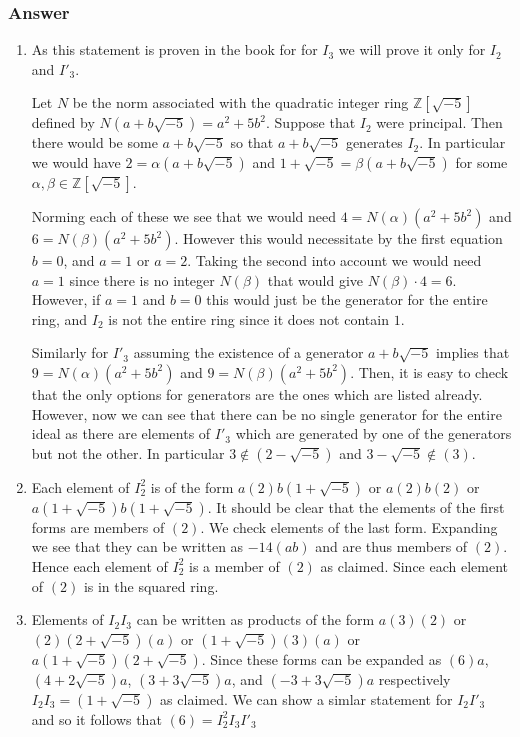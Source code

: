 \documentclass[12pt]{article}
\begin{document}
\subsubsection{Answer}
\begin{enumerate}
\item As this statement is proven in the book for for $I_3$ we will prove it only for $I_2$ and $I'_3$. 

Let $N$ be the norm associated with the quadratic integer ring $\mathbb{Z}[\sqrt{-5}]$ defined by $N(a+b\sqrt{-5})=a^2+5b^2$. Suppose that $I_2$ were principal. Then there would be some $a + b\sqrt{-5}$ so that $a + b\sqrt{-5}$ generates $I_2$. In particular we would have $2=\alpha (a+ b \sqrt{-5})$ and $1+\sqrt{-5}=\beta(a+b\sqrt{-5})$ for some $\alpha, \beta \in \mathbb{Z}[\sqrt{-5}]$. 

Norming each of these we see that we would need $4= N(\alpha)(a^2+5b^2)$ and $6= N(\beta)(a^2+5b^2)$. However this would necessitate by the first equation $b=0$, and $a=1$ or $a=2$. Taking the second into account we would need $a=1$ since there is no integer $N(\beta)$ that would give $N(\beta) \cdot 4 = 6$. However, if $a=1$ and $b=0$ this would just be the generator for the entire ring, and $I_2$ is not the entire ring since it does not contain $1$.

Similarly for $I'_3$ assuming the existence of a generator $a+b\sqrt{-5}$ implies that $9=N(\alpha)(a^2+5b^2)$ and $9=N(\beta)(a^2+5b^2)$. Then, it is easy to check that the only options for generators are the ones which are listed already. However, now we can see that there can be no single generator for the entire ideal as there are elements of $I'_3$ which are generated by one of the generators but not the other. In particular $3 \notin (2-\sqrt{-5})$ and $3-\sqrt{-5} \notin (3)$.
\item Each element of $I_2^2 $ is of the form $a(2)b(1+\sqrt{-5})$ or $a(2)b(2)$ or $a(1+\sqrt{-5})b(1+\sqrt{-5})$.  It should be clear that the elements of the first forms are members of $(2)$. We check elements of the last form. Expanding we see that they can be written as $-14(a b)$ and are thus members of $(2)$. Hence each element of $I_2^2$ is a member of $(2)$ as claimed. Since each element of $(2)$ is in the squared ring.
\item Elements of $I_2 I_3$ can be written as products of the form $a(3)(2)$ or $(2)(2+\sqrt{-5})(a)$ or $(1+\sqrt{-5})(3)(a)$ or $a(1+\sqrt{-5})(2+\sqrt{-5})$. Since these forms can be expanded as $(6)a$, $(4+2\sqrt{-5})a$, $(3+3\sqrt{-5})a$, and $(-3+3\sqrt{-5})a$ respectively $I_2 I_3 = (1+\sqrt{-5})$ as claimed. We can show a simlar statement for $I_2 I'_3$ and so it follows that $(6) = I_2^2 I_3 I'_3$
\end{enumerate}
\end{document}
